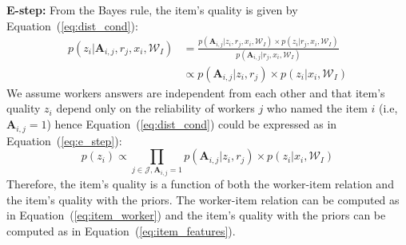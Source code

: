 \noindent\textbf{E-step:}
From the Bayes rule, the item's quality is given by Equation~(\ref{eq:dist_cond}):
\begin{align}
    p(z_i|\mathbf{A}_{i,j},r_{j},x_i,\mathcal{W}_I)&=\frac{p(\mathbf{A}_{i,j}|z_i,r_j,x_i,\mathcal{W}_I)\times p(z_i|r_j,x_i,\mathcal{W}_I)}{p(\mathbf{A}_{i,j}|r_j,x_i,\mathcal{W}_I)}\nonumber\\
        &\propto p(\mathbf{A}_{i,j}|z_i,r_j)\times p(z_i|x_i,\mathcal{W}_I)
    \label{eq:dist_cond}
\end{align}
We assume workers answers are independent from each other and 
that item's quality $z_i$ depend only on the reliability of workers $j$ who named the
item $i$ (i.e, $\mathbf{A}_{i,j}=1$) hence Equation~(\ref{eq:dist_cond})
could be expressed as in Equation~(\ref{eq:e_step}):
\begin{equation}
    p(z_i) \propto \prod_{j \in \mathcal{J},\mathbf{A}_{i,j}=1} p(\mathbf{A}_{i,j}|z_i,r_{j})\times p(z_i|x_i,\mathcal{W}_I)
    \label{eq:e_step}
\end{equation}
Therefore, the item's quality is a function of both the worker-item relation and the item's quality with the priors.
The worker-item relation can be computed as in Equation~(\ref{eq:item_worker}) and the item's quality with 
the priors can be computed as in Equation~(\ref{eq:item_features}).

